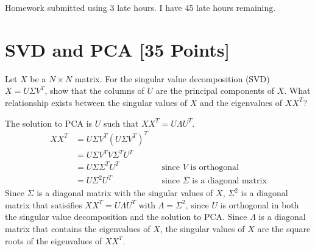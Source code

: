 






Homework submitted using 3 late hours. I have 45 late hours remaining.

\section{SVD and PCA [35 Points]}

\problem[3] Let $X$ be a $N \times N$ matrix. For the singular value decomposition (SVD) $X = U \Sigma V^T$, show that the columns of $U$ are the principal components of $X$. What relationship exists between the singular values of $X$ and the eigenvalues of $XX^T$?

\begin{solution}
    The solution to PCA is $U$ such that $X X^T =  U \Lambda U^T$.
    \begin{align*}
        X X^T &= U \Sigma V^T (U \Sigma V^T)^T\\
        &= U \Sigma V^T V \Sigma^T U^T\\
        &= U \Sigma \Sigma^T U^T && \text{since $V$ is orthogonal}\\
        &= U \Sigma^2 U^T && \text{since $\Sigma$ is a diagonal matrix}
    \end{align*}
    Since $\Sigma$ is a diagonal matrix with the singular values of $X$, $\Sigma^2$ is a diagonal matrix that satisifies $X X^T = U \Lambda U^T$ with $\Lambda = \Sigma^2$, since $U$ is orthogonal in both the singular value decomposition and the solution to PCA. Since $\Lambda$ is a diagonal matrix that contains the eigenvalues of $X$, the singular values of $X$ are the square roots of the eigenvalues of $X X^T$.
\end{solution}


